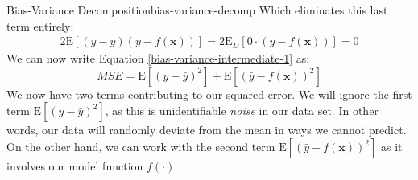 \begin{derivation}{Bias-Variance Decomposition}{bias-variance-decomp}
    Which eliminates this last term entirely:
    \begin{align*}
        2\mathrm{E}[(y - \bar{y})(\bar{y} - f(\textbf{x}))] = 2\mathrm{E}_{D}[0 \cdot (\bar{y} - f(\textbf{x}))] = 0
    \end{align*}
    We can now write Equation \ref{bias-variance-intermediate-1} as:
    \begin{equation} \label{bias-variance-intermediate-2}
        \textit{MSE} = \mathrm{E}[(y - \bar{y})^{2}] + \mathrm{E}[(\bar{y} - f(\textbf{x}))^{2}]
    \end{equation}
    We now have two terms contributing to our squared error. We will ignore the first term $\mathrm{E}[(y - \bar{y})^{2}]$, as this is unidentifiable \textit{noise} in our data set. In other words, our data will randomly deviate from the mean in ways we cannot predict. On the other hand, we can work with the second term $\mathrm{E}[(\bar{y} - f(\textbf{x}))^{2}]$ as it involves our model function $f(\cdot)$ \\


\end{derivation}
